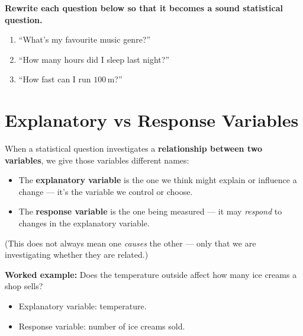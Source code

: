 \documentclass[11pt]{article}
\newcommand{\ans}{\hrulefill}
\newcommand{\anshere}{\par\vspace{0.4em}\noindent\ans\par\vspace{0.4em}}
\begin{document}
\vspace{0.3em}
\noindent\textbf{Rewrite each question below so that it becomes a sound statistical question.}
\begin{enumerate}[label=(\alph*)]
  \item ``What's my favourite music genre?''
  \anshere
  \item ``How many hours did I sleep last night?''
  \anshere
  \item ``How fast can I run $100$\,m?''
  \anshere
\end{enumerate}

\newpage

\section{Explanatory vs Response Variables}

\noindent When a statistical question investigates a \textbf{relationship between two
variables}, we give those variables different names:
\begin{itemize}[leftmargin=1.4em, itemsep=0.2em, topsep=0.2em]
  \item The \textbf{explanatory variable} is the one we think might explain or influence a
    change --- it's the variable we control or choose.
  \item The \textbf{response variable} is the one being measured --- it may \emph{respond} to
    changes in the explanatory variable.
\end{itemize}
\noindent (This does not always mean one \emph{causes} the other --- only that we are
investigating whether they are related.)

\vspace{0.3em}
\noindent\textbf{Worked example:} Does the temperature outside affect how many ice creams a shop
sells?
\begin{itemize}[leftmargin=1.4em, itemsep=0.2em, topsep=0.2em]
  \item Explanatory variable: temperature.
  \item Response variable: number of ice creams sold.
\end{itemize}
\end{document}
